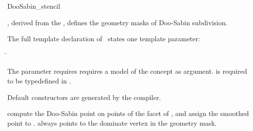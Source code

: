 \begin{ccRefClass}{DooSabin_stencil}

\ccDefinition

\ccClassTemplateName , derived from the , 
defines the geometry masks of Doo-Sabin subdivision. 


\ccParameters

The full template declaration of \ccClassTemplateName\ states one
template parameter:

\begin{tabbing}
 \=\\
\end{tabbing}
   
The  parameter requires requires a model of 
the  concept as argument. 
 is required to be typedefined in .

\ccCreation

Default constructors are generated by the compiler.

\ccThree{}{}{}

{compute the Doo-Sabin point on points of the facet of , 
and assign the smoothed point to .  always 
points to the dominate vertex in the geometry mask.}


\ccSeeAlso

\\
\\

\end{ccRefClass}

\ccRefPageEnd


